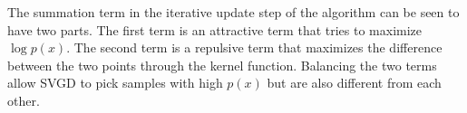 The summation term in the iterative update step of the algorithm can be seen to have two parts. The first term is an attractive term that tries to maximize $\log p(x)$. The second term is a repulsive term that maximizes the difference between the two points through the kernel function. Balancing the two terms allow SVGD to pick samples with high $p(x)$ but are also different from each other.






